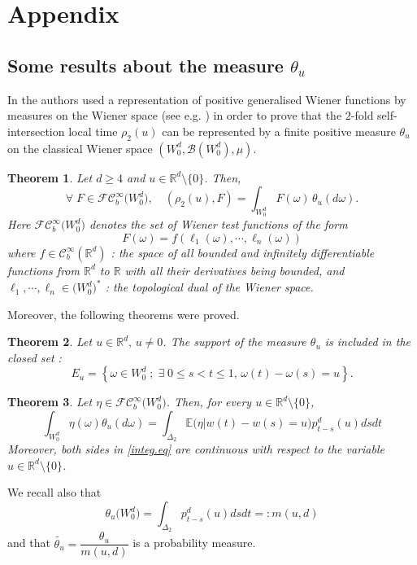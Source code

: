 \documentclass[]{interact}
\newcommand{\E}{{\mathbb{E}}}
\newcommand{\R}{{\mathbb{R}}}
\newcommand{\1}{\mathbf{1}}
\theoremstyle{plain}%
\newtheorem{thm}{Theorem}[section]
\theoremstyle{definition}
\theoremstyle{remark}
\begin{document}
\section{Appendix} \label{Appendix}
\subsection{Some results about the measure $\theta_u$} \label{App1}
In \cite{DS23} the authors used a representation of positive generalised Wiener functions by measures on the Wiener space (see e.g. \cite[Theorem 4.1.]{Su88}) in order to prove that the $2$-fold self-intersection local time $\rho_2(u)$ can be represented by a finite positive measure $\theta_u$ on the classical Wiener space $(W_0^d,\mathcal{B}(W_0^d),\mu)$.

\begin{thm}\cite[Theorem 4]{DS23}\label{thm0} Let $d\geqslant 4$ and $u\in \R^d\setminus \{0\}$. Then,
$$\forall \; F\in \mathcal{FC}_b^{\infty}\big( W_0^d\big) ,\quad (\rho_2(u), F)=\int_{ W_0^d }  F(\omega )\,\theta_{u} (d\omega).$$
Here $\mathcal{FC}_b^{\infty}\big( W_0^d\big)$ denotes the set of Wiener test functions of the form 
$$F(\omega)=f(\ell_1(\omega),\cdots,\ell_n(\omega) )$$ 
where $f\in \mathcal{C}_b^{\infty}(\R^d)$ : the space of all bounded and infinitely differentiable functions from $\R^d$ to $\R$ with all their derivatives being bounded, and $\ell_1,\cdots,\ell_n \in \big( W_0^d \big) ^*$ : the topological dual of the Wiener space.
\end{thm}


Moreover, the following theorems were proved.
\begin{thm}\cite[Theorem 5]{DS23}\label{thm1}
Let $u\in \R^d,\,u\neq 0$. The support of the measure $\theta_u$ is included in the closed set : 
$$ E_u=\left\lbrace \omega \in W_0^d\; ; \; \exists \;0\leqslant s<t \leqslant 1,\, \omega(t)-\omega (s)=u \right\rbrace . $$
\end{thm}
\begin{thm}\label{thm2} \cite[Theorem 7]{DS23}
Let $\eta \in \mathcal{FC}_b^{\infty}\big( W_0^d\big) $. Then, for every $u\in \R^d\setminus \{0\}$,
\begin{equation} \label{integ.eq}
\int_{W_0^d  } \eta(\omega) \theta_{u} (d\omega) = \int_{\Delta_2  } \E \big(\eta\big | w(t)-w(s)=u\big)p_{t-s}^d(u)dsdt 
\end{equation}
Moreover, both sides in \eqref{integ.eq} are continuous with respect to the variable $u\in \R^d\setminus \{0\}$.
\end{thm}
\noindent We recall also that 
$$
\theta_{u} \big( W_0^d\big)= \int_{\Delta_2  } p_{t-s}^d(u)dsdt  =: m(u,d)
$$
and that $ \widetilde{\theta_u}=\dfrac{\theta_u }{m(u,d) } $ is a probability measure. 
\end{document}
